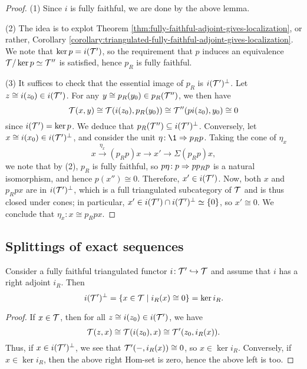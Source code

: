 \begin{proof}
(1) Since \(i\) is fully faithful, we are done by the above lemma.

(2) The idea is to explot Theorem \ref{thm:fully-faithful-adjoint-gives-localization}, or rather, Corollary \ref{corollary:triangulated-fully-faithful-adjoint-gives-localization}. We note
that \(\ker{p} = i(\mathcal{T}')\), so the requirement that \(p\) induces an equivalence \(\mathcal{T}/\ker{p}\simeq\mathcal{T}''\) is satisfied, hence \(p_R\) is fully faithful.

(3) It suffices to check that the essential image of \(p_R\) is \(i(\mathcal{T}')^\perp\). Let \(z\cong i(z_0)\in i(\mathcal{T}')\). For any \(y\cong p_R(y_0)\in p_R(\mathcal{T}'')\), we then have
\[ \mathcal{T}(x,y) \cong \mathcal{T}(i(z_0),p_R(y_0)) \cong \mathcal{T}''(pi(z_0),y_0) \cong 0 \]
since \(i(\mathcal{T}') = \ker{p}\). We deduce that \(p_R(\mathcal{T}'')\subseteq i(\mathcal{T}')^\perp\). Conversely, let \(x\cong i(x_0) \in i(\mathcal{T}')^\perp\), and consider the unit \(\eta\!:\1\To p_Rp\). Taking the cone of \(\eta_x\)
\[ x \overset{\eta_x}\to (p_Rp)x \to x' \to \Sigma (p_Rp)x, \]
we note that by (2), \(p_R\) is fully faithful, so \(p\eta\!: p \Rightarrow pp_Rp\) is a natural isomorphism, and hence \(p(x'') \cong 0\). Therefore, \(x'\in i(\mathcal{T}')\). Now, both \(x\) and \(p_Rpx\) are in \(i(\mathcal{T}')^\perp\),
which is a full triangulated subcategory of \(\mathcal{T}\) and is thus closed under cones; in particular, \(x' \in i(\mathcal{T}')\cap i(\mathcal{T}')^\perp\simeq \{0\}\), so \(x' \cong 0\). We conclude that \(\eta_x\!:x\cong p_Rpx\).
\end{proof}

\subsection{Splittings of exact sequences}
\begin{lemma}\label{lemma:orthogonal-complement-is-kernel-of-adjoint}
	Consider a fully faithful triangulated functor \( i\!:\mathcal{T}' \hookrightarrow \mathcal{T} \) and assume that \(i\) has a right adjoint \(i_R\). Then
	\[ i(\mathcal{T}')^\perp = \{ x\in\mathcal{T}\mid i_R(x) \cong 0 \} = \ker{i_R}. \]
\end{lemma}
\begin{proof}
If \(x\in \mathcal{T}\), then for all \(z\cong i(z_0)\in i(\mathcal{T}')\), we have
\[ \mathcal{T}(z,x) \cong \mathcal{T}(i(z_0),x) \cong \mathcal{T}'(z_0,i_R(x)). \]
Thus, if \(x\in i(\mathcal{T}')^\perp\), we see that \(\mathcal{T}'(-, i_R(x)) \cong 0\), so \(x\in\ker{i_R}\). Conversely, if \(x\in\ker{i_R}\), then the above right Hom-set is zero, hence the above left is too.
\end{proof}

